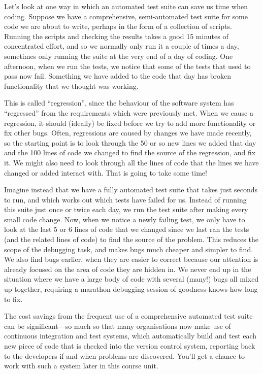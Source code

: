 \documentclass[
]{book}
\begin{document}
Let's look at one way in which an automated test suite can save us time when coding. Suppose we have a comprehensive, semi-automated test suite for some code we are about to write, perhaps in the form of a collection of scripts. Running the scripts and checking the results takes a good 15 minutes of concentrated effort, and so we normally only run it a couple of times a day, sometimes only running the suite at the very end of a day of coding. One afternoon, when we run the tests, we notice that some of the tests that used to pass now fail. Something we have added to the code that day has broken functionality that we thought was working.

This is called ``regression'', since the behaviour of the software system has ``regressed'' from the requirements which were previously met. When we cause a regression, it should (ideally) be fixed before we try to add more functionality or fix other bugs. Often, regressions are caused by changes we have made recently, so the starting point is to look through the 50 or so new lines we added that day and the 100 lines of code we changed to find the source of the regression, and fix it. We might also need to look through all the lines of code that the lines we have changed or added interact with. That is going to take some time!

Imagine instead that we have a fully automated test suite that takes just seconds to run, and which works out which tests have failed for us. Instead of running this suite just once or twice each day, we run the test suite after making every small code change. Now, when we notice a newly failing test, we only have to look at the last 5 or 6 lines of code that we changed since we last ran the tests (and the related lines of code) to find the source of the problem. This reduces the scope of the debugging task, and makes bugs much cheaper and simpler to find. We also find bugs earlier, when they are easier to correct because our attention is already focused on the area of code they are hidden in. We never end up in the situation where we have a large body of code with several (many!) bugs all mixed up together, requiring a marathon debugging session of goodness-knows-how-long to fix.

The cost savings from the frequent use of a comprehensive automated test suite can be significant---so much so that many organisations now make use of continuous integration and test systems, which automatically build and test each new piece of code that is checked into the version control system, reporting back to the developers if and when problems are discovered. You'll get a chance to work with such a system later in this course unit.
\end{document}
